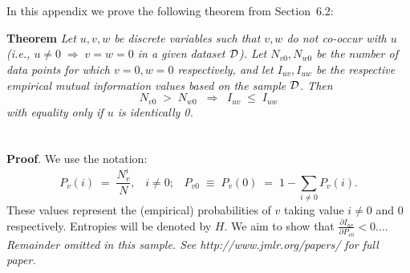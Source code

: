 \documentclass[twoside,11pt]{article}
\newcommand{\dataset}{{\cal D}}
\newcommand{\fracpartial}[2]{\frac{\partial #1}{\partial  #2}}
\begin{document}

\newpage

\appendix
\section{}
\label{app:theorem}



In this appendix we prove the following theorem from
Section~6.2:

\noindent
{\bf Theorem} {\it Let $u,v,w$ be discrete variables such that $v, w$ do
not co-occur with $u$ (i.e., $u\neq0\;\Rightarrow \;v=w=0$ in a given
dataset $\dataset$). Let $N_{v0},N_{w0}$ be the number of data points for
which $v=0, w=0$ respectively, and let $I_{uv},I_{uw}$ be the
respective empirical mutual information values based on the sample
$\dataset$. Then
\[
	N_{v0} \;>\; N_{w0}\;\;\Rightarrow\;\;I_{uv} \;\leq\;I_{uw}
\]
with equality only if $u$ is identically 0.} \hfill\BlackBox

\section{}

\noindent
{\bf Proof}. We use the notation:
\[
P_v(i) \;=\;\frac{N_v^i}{N},\;\;\;i \neq 0;\;\;\;
P_{v0}\;\equiv\;P_v(0)\; = \;1 - \sum_{i\neq 0}P_v(i).
\]
These values represent the (empirical) probabilities of $v$
taking value $i\neq 0$ and 0 respectively.  Entropies will be denoted
by $H$. We aim to show that $\fracpartial{I_{uv}}{P_{v0}} < 0$....\\

{\noindent \em Remainder omitted in this sample. See http://www.jmlr.org/papers/ for full paper.}


\vskip 0.2in

\end{document}
